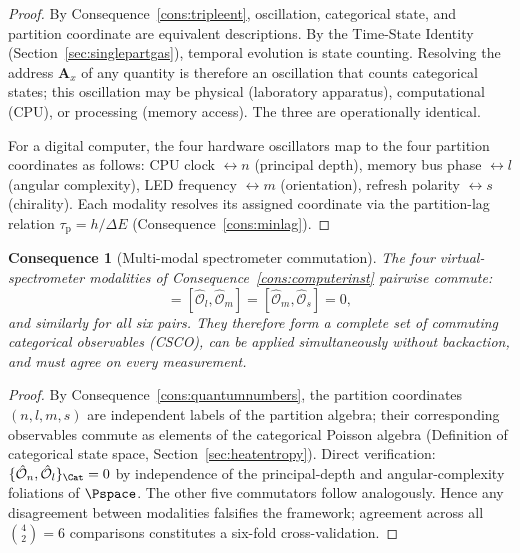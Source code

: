 \documentclass[11pt,twocolumn,a4paper]{article}
\theoremstyle{axiomstyle}
\theoremstyle{conseqstyle}
\newtheorem{consequence}{Consequence}
\theoremstyle{definition}
\theoremstyle{remark}
\newcommand{\taup}{\tau_{\mathrm{p}}}
\begin{document}
\begin{proof}
By Consequence~\ref{cons:tripleent}, oscillation, categorical state, and partition coordinate are equivalent descriptions. By the Time-State Identity (Section~\ref{sec:singlepartgas}), temporal evolution is state counting. Resolving the address $\mathbf{A}_{x}$ of any quantity is therefore an oscillation that counts categorical states; this oscillation may be physical (laboratory apparatus), computational (CPU), or processing (memory access). The three are operationally identical.

For a digital computer, the four hardware oscillators map to the four partition coordinates as follows: CPU clock $\leftrightarrow n$ (principal depth), memory bus phase $\leftrightarrow l$ (angular complexity), LED frequency $\leftrightarrow m$ (orientation), refresh polarity $\leftrightarrow s$ (chirality). Each modality resolves its assigned coordinate via the partition-lag relation $\taup=h/\Delta E$ (Consequence~\ref{cons:minlag}).
\end{proof}

\begin{consequence}[Multi-modal spectrometer commutation]\label{cons:mmsspectrometer}
The four virtual-spectrometer modalities of Consequence~\ref{cons:computerinst} pairwise commute:
\begin{equation}
[\hat{\mathcal{O}}_{n},\hat{\mathcal{O}}_{l}]=[\hat{\mathcal{O}}_{l},\hat{\mathcal{O}}_{m}]=[\hat{\mathcal{O}}_{m},\hat{\mathcal{O}}_{s}]=0,
\end{equation}
and similarly for all six pairs. They therefore form a complete set of commuting categorical observables (CSCO), can be applied simultaneously without backaction, and must agree on every measurement.
\end{consequence}

\begin{proof}
By Consequence~\ref{cons:quantumnumbers}, the partition coordinates $(n,l,m,s)$ are independent labels of the partition algebra; their corresponding observables commute as elements of the categorical Poisson algebra (Definition of categorical state space, Section~\ref{sec:heatentropy}). Direct verification: $\{\hat{\mathcal{O}}_{n},\hat{\mathcal{O}}_{l}\}_{\Cat}=0$ by independence of the principal-depth and angular-complexity foliations of $\Pspace$. The other five commutators follow analogously. Hence any disagreement between modalities falsifies the framework; agreement across all $\binom{4}{2}=6$ comparisons constitutes a six-fold cross-validation.
\end{proof}
\end{document}
